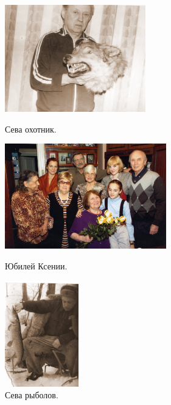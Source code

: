 \documentclass[utf8x, 12pt]{G7-32a} %
\begin{document}
\vspace{5pt}

\begin{figure}[h!]
    \begin{minipage}[h!]{61mm}
         \vspace{10pt}
         \begin{center}
         \vspace{-15pt}
         \includegraphics[width=61mm]{inc/Varzar/31.jpg} 
         \end{center}
         \vspace{-10pt}
         Сева охотник.
    \end{minipage}
    \hfill
   \begin{minipage}[h]{65mm}
       \begin{center}
       \includegraphics[width=70mm]{inc/Varzar/32.jpg} 
       \end{center}
       \caption{Юбилей Ксении.}
   \end{minipage}
   \hfill
    \begin{minipage}[h!]{32mm}
        \begin{center}
        \includegraphics[width=32mm]{inc/Varzar/33.jpg}
        \end{center}
        \caption{Сева рыболов.}
    \end{minipage}
\end{figure}
\end{document}
